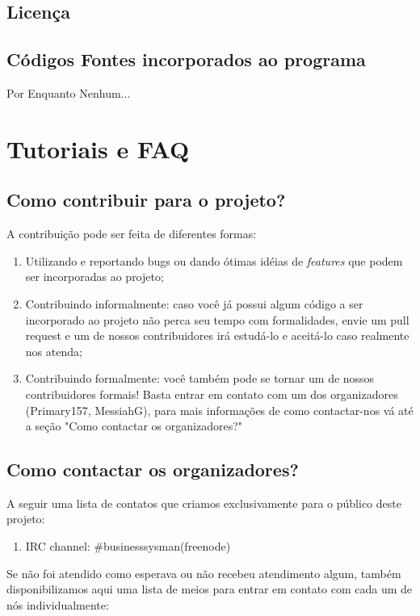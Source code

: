 \documentclass[a4paper,12pt]{article}
\begin{document}
		\subsection{Licença} 
		
		\subsection{Códigos Fontes incorporados ao programa}
		
		Por Enquanto Nenhum...
		
	\section{Tutoriais e FAQ}
		\subsection{Como contribuir para o projeto?}
		A contribuição pode ser feita de diferentes formas:
		\begin{enumerate}
			\item Utilizando e reportando bugs ou dando ótimas idéias de \textit{features} que podem ser incorporadas ao projeto;
			\item Contribuindo informalmente: caso você já possui algum código a ser incorporado ao projeto não perca seu tempo com formalidades, envie um pull request e um de nossos contribuidores irá estudá-lo e aceitá-lo caso realmente nos atenda;
			\item Contribuindo formalmente: você também pode se tornar um de nossos contribuidores formais! Basta entrar em contato com um dos organizadores (Primary157, MessiahG), para mais informações de como contactar-nos vá até a seção "Como contactar os organizadores?"
		\end{enumerate}
		\subsection{Como contactar os organizadores?}
		A seguir uma lista de contatos que criamos exclusivamente para o público deste projeto:
		 \begin{enumerate}
		 	\item IRC channel: \#businesssysman(freenode)
		 \end{enumerate}
		Se não foi atendido como esperava ou não recebeu atendimento algum, também disponibilizamos aqui uma lista de meios para entrar em contato com cada um de nós individualmente:
\end{document}

